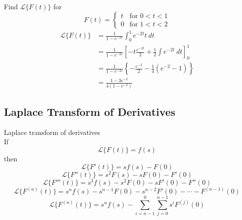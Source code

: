 \documentclass[12pt]{article}
\newcommand{\Lap}{\mathscr{L}}
\begin{document}
\begin{example}{Find $\Lap \{ F(t) \}$ for \[
    F(t) =
    \begin{cases}
        t & \text{for } 0 < t < 1 \\
        0 & \text{for } 1 < t < 2
    \end{cases}
\]}{}
    \begin{align*}
        \Lap \{ F(t) \} &= \frac{1}{1-e^{-2s}} \int_{0}^{1} {e^{-2t}t} \: d{t} \\
        &= \frac{1}{1 - e^{-2s}} \left[ -t \frac{e^{-2t}}{2} + \frac{1}{2}\int{e^{-2t}} \: d{t} \right]_{0}^{1} \\
        &= \frac{1}{1 - e^{-2s}} \left\{ -\frac{e^{-2}}{2} - \frac{1}{4} (e^{-2} - 1) \right\} \\
        &= \frac{1-3e^{-2}}{4(1-e^{-2})}
    \end{align*}
\end{example}


\subsection{Laplace Transform of Derivatives}
\begin{theorem}{Laplace transform of derivatives}{}
    \\If \[
        \Lap \{ F(t) \} = f(s)
    \] then \[
        \Lap \{ F'(t) \} = sf(s) - F(0)
    \] \[
        \Lap \{ F''(t) \} = s^2F(s) - sF(0) - F'(0)
    \] \[
        \Lap \{ F'''(t) \} = s^3f(s) - s^2F(0) - sF'(0) - F''(0)
    \] \[
        \boxed{ \Lap \{ F^{(n)}(t) \} = s^nf(s) - s^{n-1}F(0) - s^{n-2}F'(0) - \cdots - F^{(n-1)}(0) }
    \] \[
        \boxed{ \Lap \{ F^{(n)}(t) \} = s^nf(s) - \sum_{i=n-1}^{0}\sum_{j=0}^{n-1} s^i F^{(j)}(0) }
    \]
\end{theorem}
\end{document}
